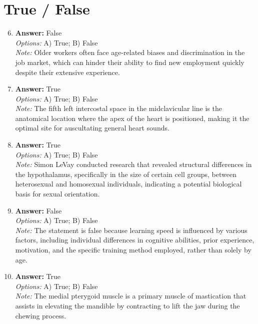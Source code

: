 \documentclass[12pt]{article}
\begin{document}
\section*{True / False}
\begin{enumerate}[label=\arabic*.]
\setcounter{enumi}{5}
\item \textbf{Answer:} False
\\ \textit{Options:} A) True; B) False
\\ \textit{Note:} Older workers often face age-related biases and discrimination in the job market, which can hinder their ability to find new employment quickly despite their extensive experience.
\item \textbf{Answer:} True
\\ \textit{Options:} A) True; B) False
\\ \textit{Note:} The fifth left intercostal space in the midclavicular line is the anatomical location where the apex of the heart is positioned, making it the optimal site for auscultating general heart sounds.
\item \textbf{Answer:} True
\\ \textit{Options:} A) True; B) False
\\ \textit{Note:} Simon LeVay conducted research that revealed structural differences in the hypothalamus, specifically in the size of certain cell groups, between heterosexual and homosexual individuals, indicating a potential biological basis for sexual orientation.
\item \textbf{Answer:} False
\\ \textit{Options:} A) True; B) False
\\ \textit{Note:} The statement is false because learning speed is influenced by various factors, including individual differences in cognitive abilities, prior experience, motivation, and the specific training method employed, rather than solely by age.
\item \textbf{Answer:} True
\\ \textit{Options:} A) True; B) False
\\ \textit{Note:} The medial pterygoid muscle is a primary muscle of mastication that assists in elevating the mandible by contracting to lift the jaw during the chewing process.
\end{enumerate}
\end{document}

